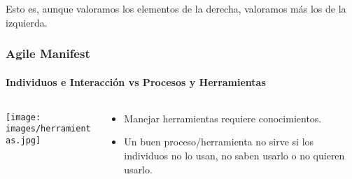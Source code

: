 {\begin{frame}
{    Esto es, aunque valoramos los elementos de la derecha,
    valoramos más los de la izquierda.
    }
   \end{frame}

   \usebackgroundtemplate{}

  \begin{frame}
   \frametitle{Agile Manifest}
   \framesubtitle{Individuos e Interacción vs Procesos y Herramientas}

   \begin{columns}
    \begin{column}{4cm}
     \texttt{[image: images/herramientas.jpg]}
    \end{column}
    \begin{column}{7cm}
     \begin{itemize}
      \item<1-> Manejar herramientas requiere conocimientos.
      \item<2-> Un buen proceso/herramienta no sirve si los individuos no lo usan, no saben usarlo o no quieren usarlo.
     \end{itemize}
    \end{column}
   \end{columns}
  \end{frame}


}
